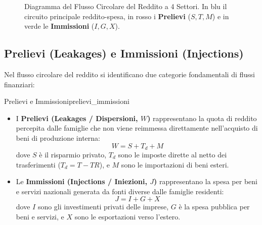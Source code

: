 \begin{figure}[htbp]
\caption{Diagramma del Flusso Circolare del Reddito a 4 Settori. In blu il circuito principale reddito-spesa, in rosso i \textbf{Prelievi} ($S, T, M$) e in verde le \textbf{Immissioni} ($I, G, X$).}
\label{fig:flusso_circolare}
\end{figure}

\subsection{Prelievi (Leakages) e Immissioni (Injections)}
Nel flusso circolare del reddito si identificano due categorie fondamentali di flussi finanziari:

\begin{definizione}{Prelievi e Immissioni}{prelievi_immissioni}
\begin{itemize}
    \item I \textbf{Prelievi (Leakages / Dispersioni, $W$)} rappresentano la quota di reddito percepita dalle famiglie che non viene reimmessa direttamente nell'acquisto di beni di produzione interna:
    \begin{equation}
        W = S + T_d + M
    \end{equation}
    dove $S$ è il risparmio privato, $T_d$ sono le imposte dirette al netto dei trasferimenti ($T_d = T - TR$), e $M$ sono le importazioni di beni esteri.
    
    \item Le \textbf{Immissioni (Injections / Iniezioni, $J$)} rappresentano la spesa per beni e servizi nazionali generata da fonti diverse dalle famiglie residenti:
    \begin{equation}
        J = I + G + X
    \end{equation}
    dove $I$ sono gli investimenti privati delle imprese, $G$ è la spesa pubblica per beni e servizi, e $X$ sono le esportazioni verso l'estero.
\end{itemize}
\end{definizione}

